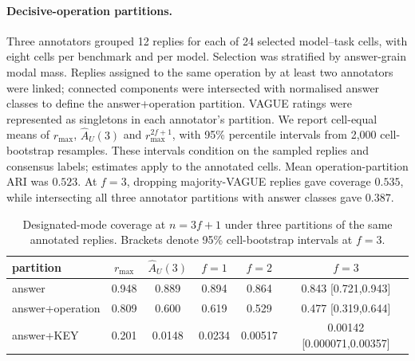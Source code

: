 \paragraph{Decisive-operation partitions.}
Three annotators grouped 12 replies for each of 24 selected model--task cells,
with eight cells per benchmark and per model. Selection was stratified by
answer-grain modal mass. Replies assigned to the same operation by at least two
annotators were linked; connected components were intersected with normalised
answer classes to define the answer+operation partition. VAGUE ratings were
represented as singletons in each annotator's partition. We report cell-equal
means of $r_{\max}$, $\widehat A_U(3)$ and $r_{\max}^{2f+1}$, with 95\% percentile
intervals from 2,000 cell-bootstrap resamples. These intervals condition on the
sampled replies and consensus labels; estimates apply to the annotated cells.
Mean operation-partition ARI was $0.523$. At $f=3$, dropping majority-VAGUE
replies gave coverage $0.535$, while intersecting all three annotator partitions
with answer classes gave $0.387$.

\begin{table}[htbp]\centering\small
\caption{Designated-mode coverage at $n=3f+1$ under three partitions of the
same annotated replies. Brackets denote 95\% cell-bootstrap intervals at $f=3$.}
\label{tab:op-partitions}
\begin{tabular}{lccccc}\toprule
partition & $r_{\max}$ & $\widehat A_U(3)$ & $f=1$ & $f=2$ & $f=3$\\\midrule
answer & 0.948 & 0.889 & 0.894 & 0.864 & 0.843 [0.721,0.943]\\
answer+operation & 0.809 & 0.600 & 0.619 & 0.529 & 0.477 [0.319,0.644]\\
answer+KEY & 0.201 & 0.0148 & 0.0234 & 0.00517 & 0.00142 [0.000071,0.00357]\\
\bottomrule\end{tabular}
\end{table}
